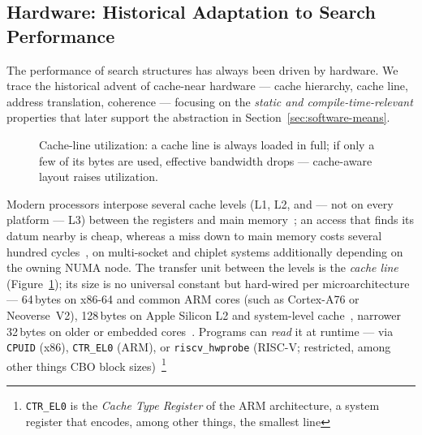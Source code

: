 \begin{nurlang}
\section{Hardware: Historical Adaptation to Search Performance}\label{sec:hardware-history}
The performance of search structures has always been driven by hardware. We trace the historical advent of
cache-near hardware --- cache hierarchy, cache line, address translation, coherence --- focusing on the
\emph{static and compile-time-relevant} properties that later support the abstraction in
Section~\ref{sec:software-means}.
\begin{figure}[htbp]\centering
{}
\caption{Cache-line utilization: a cache line is always loaded in full; if only a few of its bytes are used, effective bandwidth drops --- cache-aware layout raises utilization.}\label{fig:cache-line}
\end{figure}
Modern processors interpose several cache levels (L1, L2, and --- not on every platform --- L3) between
the registers and main memory~\cite{hennessy2019architecture}; an access that finds its datum nearby is
cheap, whereas a miss down to main memory costs several hundred cycles~\cite{drepper2007memory}, on
multi-socket and chiplet systems additionally depending on the owning NUMA node. The transfer unit between the levels
is the \emph{cache line} (Figure~\ref{fig:cache-line}); its size is no universal constant but hard-wired
per microarchitecture --- 64\,bytes on x86-64 and common ARM cores (such as Cortex-A76 or Neoverse~V2),
128\,bytes on Apple Silicon L2 and system-level cache~\cite{apple_optimization},
narrower 32\,bytes on older or embedded
cores~\cite{hennessy2019architecture,intel_optimization,amd_sog}. Programs can
\emph{read} it at runtime --- via \texttt{CPUID} (x86), \texttt{CTR\_EL0} (ARM), or \texttt{riscv\_hwprobe}
(RISC-V\@; restricted, among other things CBO block
sizes)~\cite{arm_arm,intel_sdm,linux_riscv_hwprobe}\footnote{\texttt{CTR\_EL0} is the \emph{Cache Type
Register} of the ARM architecture, a system register that encodes, among other things, the smallest line
}
\end{nurlang}
